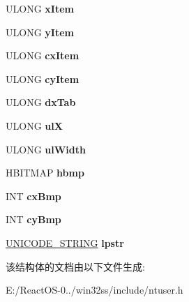 \begin{DoxyCompactItemize}
\item 
\mbox{\label{structtag_i_t_e_m_aa2de6815d21dac5d37245b62be87041f}} 
U\+L\+O\+NG {\bfseries x\+Item}
\item 
\mbox{\label{structtag_i_t_e_m_a2c0570f4c711016d2d59e54d90aea943}} 
U\+L\+O\+NG {\bfseries y\+Item}
\item 
\mbox{\label{structtag_i_t_e_m_abd6bf9dfeba639a717abf3d7ea011e3e}} 
U\+L\+O\+NG {\bfseries cx\+Item}
\item 
\mbox{\label{structtag_i_t_e_m_abf7fb75666087bbff271cc1844ac65cc}} 
U\+L\+O\+NG {\bfseries cy\+Item}
\item 
\mbox{\label{structtag_i_t_e_m_a3bad491bb8962ac7a42cd8012f74cb98}} 
U\+L\+O\+NG {\bfseries dx\+Tab}
\item 
\mbox{\label{structtag_i_t_e_m_a58dcece3f816408b5021370baecd5117}} 
U\+L\+O\+NG {\bfseries ulX}
\item 
\mbox{\label{structtag_i_t_e_m_a7c5ff1cced840be6d06b0cf0b1eb27f7}} 
U\+L\+O\+NG {\bfseries ul\+Width}
\item 
\mbox{\label{structtag_i_t_e_m_a0321de8eb92b55b8d0bccee24c03af0e}} 
H\+B\+I\+T\+M\+AP {\bfseries hbmp}
\item 
\mbox{\label{structtag_i_t_e_m_abcaf8ca18a58ab701ed73bf5de76cf2f}} 
I\+NT {\bfseries cx\+Bmp}
\item 
\mbox{\label{structtag_i_t_e_m_a058c3e10a6d1d11aa3994e15a937dc84}} 
I\+NT {\bfseries cy\+Bmp}
\item 
\mbox{\label{structtag_i_t_e_m_a7a5c13ebf549e3315f22ee9a69e581fc}} 
\hyperlink{struct___u_n_i_c_o_d_e___s_t_r_i_n_g}{U\+N\+I\+C\+O\+D\+E\+\_\+\+S\+T\+R\+I\+NG} {\bfseries lpstr}
\end{DoxyCompactItemize}


该结构体的文档由以下文件生成\+:\begin{DoxyCompactItemize}
\item 
E\+:/\+React\+O\+S-\/0../win32ss/include/ntuser.\+h\end{DoxyCompactItemize}
